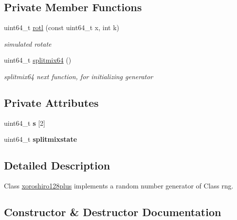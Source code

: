 \subsection*{Private Member Functions}
\begin{DoxyCompactItemize}
\item 
\mbox{\label{classxoroshiro128plus_ac80afbdcbf2c512310c4aebe42f936f0}} 
uint64\+\_\+t \hyperlink{classxoroshiro128plus_ac80afbdcbf2c512310c4aebe42f936f0}{rotl} (const uint64\+\_\+t x, int k)
\begin{DoxyCompactList}\small\item\em simulated rotate \end{DoxyCompactList}\item 
\mbox{\label{classxoroshiro128plus_aee8ea766a36b82e20c5fdc2c5184a41c}} 
uint64\+\_\+t \hyperlink{classxoroshiro128plus_aee8ea766a36b82e20c5fdc2c5184a41c}{splitmix64} ()
\begin{DoxyCompactList}\small\item\em splitmix64 next function, for initializing generator \end{DoxyCompactList}\end{DoxyCompactItemize}
\subsection*{Private Attributes}
\begin{DoxyCompactItemize}
\item 
\mbox{\label{classxoroshiro128plus_a50f3b4f14b1a5b3034d4cf3e6dde2b10}} 
uint64\+\_\+t {\bfseries s} \mbox{[}2\mbox{]}
\item 
\mbox{\label{classxoroshiro128plus_acdcc17b31842b463c1a00360b182b3aa}} 
uint64\+\_\+t {\bfseries splitmixstate}
\end{DoxyCompactItemize}


\subsection{Detailed Description}
Class \hyperlink{classxoroshiro128plus}{xoroshiro128plus} implements a random number generator of Class rng. 

\subsection{Constructor \& Destructor Documentation}
\mbox{\label{classxoroshiro128plus_ae32867bf0900c675d3b6f638ea2c49e1}} 
